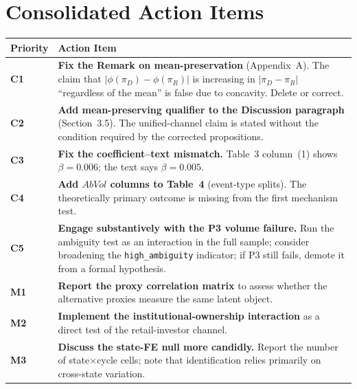\documentclass[11pt]{article}
\begin{document}
\section{Consolidated Action Items}
\label{sec:summary}

\begin{center}
\renewcommand{\arraystretch}{1.4}
\small
\begin{tabular}{@{} p{1.1cm} p{12.2cm} @{}}
\toprule
\textbf{Priority} & \textbf{Action Item} \\
\midrule
\textcolor{critical}{\textbf{C1}} &
\textbf{Fix the Remark on mean-preservation} (Appendix~A). The claim that $|\phi(\pi_D) - \phi(\pi_R)|$ is increasing in $|\pi_D - \pi_R|$ ``regardless of the mean'' is false due to concavity. Delete or correct. \\

\textcolor{critical}{\textbf{C2}} &
\textbf{Add mean-preserving qualifier to the Discussion paragraph} (Section~3.5). The unified-channel claim is stated without the condition required by the corrected propositions. \\

\textcolor{critical}{\textbf{C3}} &
\textbf{Fix the coefficient--text mismatch.} Table~3 column~(1) shows $\beta = 0.006$; the text says $\beta = 0.005$. \\

\textcolor{critical}{\textbf{C4}} &
\textbf{Add $AbVol$ columns to Table~4} (event-type splits). The theoretically primary outcome is missing from the first mechanism test. \\

\textcolor{critical}{\textbf{C5}} &
\textbf{Engage substantively with the P3 volume failure.} Run the ambiguity test as an interaction in the full sample; consider broadening the \texttt{high\_ambiguity} indicator; if P3 still fails, demote it from a formal hypothesis. \\

\textcolor{major}{\textbf{M1}} &
\textbf{Report the proxy correlation matrix} to assess whether the alternative proxies measure the same latent object. \\

\textcolor{major}{\textbf{M2}} &
\textbf{Implement the institutional-ownership interaction} as a direct test of the retail-investor channel. \\

\textcolor{major}{\textbf{M3}} &
\textbf{Discuss the state-FE null more candidly.} Report the number of state$\times$cycle cells; note that identification relies primarily on cross-state variation. \\


\end{tabular}
\end{center}
\end{document}

